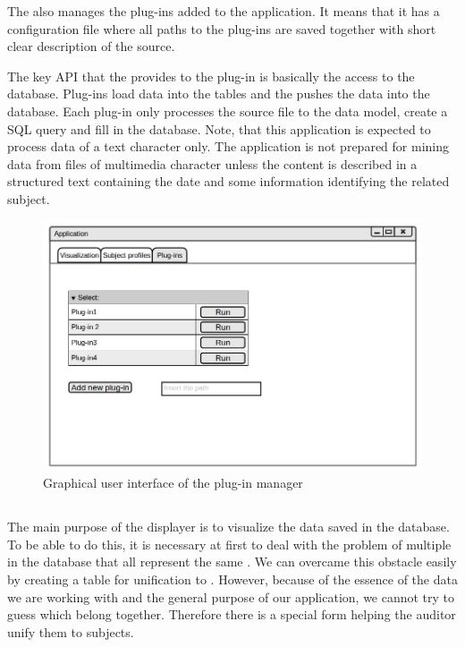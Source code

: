 The  also manages the plug-ins added to the application. It means that it has a configuration file where all paths to the plug-ins are saved together with short clear description of the source. %

The key API that the  provides to the plug-in is basically the access to the database. %
Plug-ins load data into the tables and the  pushes the data into the database. Each plug-in only processes the source file to the data model, create a SQL query and fill in the database. Note, that this application is expected to process data of a text character only. The application is not prepared for mining data from files of multimedia character unless the content is described in a structured text containing the date and some information identifying the related subject.

\begin{figure}[h]
	\begin{center} 
	\includegraphics[width=1.0\textwidth]{./img/GUI/Plug-ins.png}
	\end{center}
	\caption{Graphical user interface of the plug-in manager}\label{plug-ins}
\end{figure}

\subsection{}

The main purpose of the displayer is to visualize the data saved in the database. To be able to do this, it is necessary at first to deal with the problem of multiple  in the database that all represent the same . We can overcame this obstacle easily by creating a table for  unification to . However, because of the essence of the data we are working with and the general purpose of our application, we cannot try to guess which  belong together. Therefore there is a special form helping the auditor unify them to subjects. 


